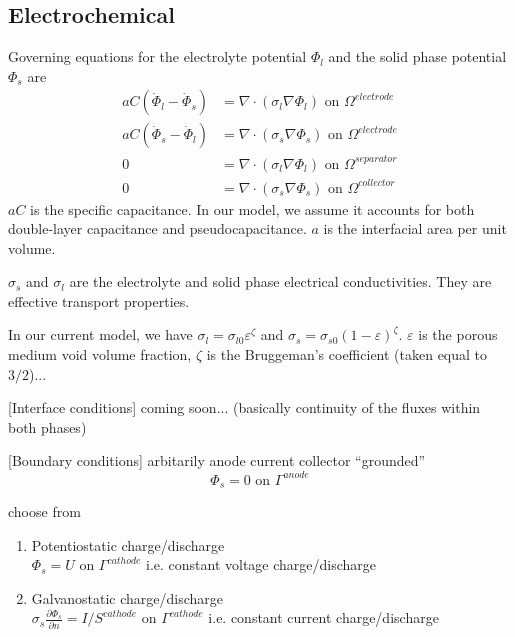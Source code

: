 \documentclass[10pt, oneside]{article}   	%
\begin{document}
\subsection{Electrochemical}

Governing equations for the electrolyte potential $\Phi_l$ and the solid phase
potential $\Phi_s$ are
\begin{align}
aC (\dot{\Phi}_l - \dot{\Phi}_s) &= \nabla \cdot (\sigma_l \nabla \Phi_l) \text{ on } \Omega^{electrode} \\
aC (\dot{\Phi}_s - \dot{\Phi}_l) &= \nabla \cdot (\sigma_s \nabla \Phi_s) \text{ on } \Omega^{electrode} \\
0 &= \nabla \cdot (\sigma_l \nabla \Phi_l) \text{ on } \Omega^{separator} \\
0 &= \nabla \cdot (\sigma_s \nabla \Phi_s) \text{ on } \Omega^{collector}
\end{align}
$aC$ is the specific capacitance. In our model, we assume it accounts for both 
double-layer capacitance and pseudocapacitance. $a$ is the interfacial area
per unit volume.

$\sigma_s$ and $\sigma_l$ are the electrolyte and solid phase electrical
conductivities. They are effective transport properties.

In our current model, we have
$\sigma_l=\sigma_{l0}\varepsilon^\zeta$ and
$\sigma_s=\sigma_{s0}(1-\varepsilon)^\zeta$.
$\varepsilon$ is the porous medium void volume fraction,
$\zeta$ is the Bruggeman's coefficient (taken equal to $3/2$)...

[Interface conditions]
coming soon... (basically continuity of the fluxes within both phases)

[Boundary conditions]
arbitarily anode current collector ``grounded''
\begin{equation}
\Phi_s = 0 \text{\ on\ } \Gamma^{anode}
\end{equation}

choose from
\begin{enumerate}
\item Potentiostatic charge/discharge \\
$\Phi_s = U \text{\ on\ } \Gamma^{cathode}$
i.e. constant voltage charge/discharge

\item Galvanostatic charge/discharge \\
$\sigma_s \frac{\partial \Phi_s}{\partial n} = I / S^{cathode} \text{\ on\ } \Gamma^{cathode}$
i.e. constant current charge/discharge
\end{enumerate}
\end{document}
